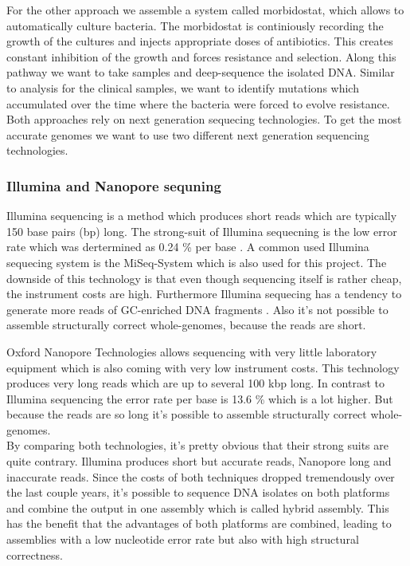 For the other approach we assemble a system called morbidostat, which allows to automatically culture bacteria. The morbidostat is continiously recording the growth of the cultures and injects appropriate doses of antibiotics. This creates constant inhibition of the growth and forces resistance and selection. Along this pathway we want to take samples and deep-sequence the isolated DNA. Similar to analysis for the clinical samples, we want to identify mutations which accumulated over the time where the bacteria were forced to evolve resistance. \\
Both approaches rely on next generation sequecing technologies. 
To get the most accurate genomes we want to use two different next generation sequencing technologies.  

\subsubsection{Illumina and Nanopore sequning}
Illumina sequencing is a method which produces short reads which are typically 150 base pairs (bp) long. The strong-suit of Illumina sequecning is the low error rate which was dertermined as 0.24 \% per base \cite{pfeiffer_systematic_2018}. A common used Illumina sequecing system is the MiSeq-System which is also used for this project. The downside of this technology is that even though sequencing itself is rather cheap, the instrument costs are high. Furthermore Illumina sequecing has a tendency to generate more reads of GC-enriched DNA fragments \cite{noauthor_illumina_nodate}. Also it's not possible to assemble structurally correct whole-genomes, because the reads are short. 

Oxford Nanopore Technologies allows sequencing with very little laboratory equipment which is also coming with very low instrument costs. This technology produces very long reads which are up to several 100 kbp long. In contrast to Illumina sequencing the error rate per base is 13.6 \% \cite{noauthor_resolving_nodate} which is a lot higher. But because the reads are so long it's possible to assemble structurally correct whole-genomes. \\
By comparing both technologies, it's pretty obvious that their strong suits are quite contrary. Illumina produces short but accurate reads, Nanopore long and inaccurate reads. Since the costs of both techniques dropped tremendously over the last couple years, it's possible to sequence DNA isolates on both platforms and combine the output in one assembly which is called hybrid assembly. This has the benefit that the advantages of both platforms are combined, leading to assemblies with a low nucleotide error rate but also with high structural correctness.  \\


